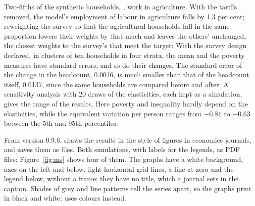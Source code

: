 Two-fifths of the synthetic households, , work in agriculture.
With the tariffs removed, the model's employment of labour in agriculture
falls by 1.3 per cent; reweighting the survey so that the agricultural
households fall in the same proportion lowers their weights by that much and
leaves the others' unchanged, the closest weights to the survey's that meet
the target:
With the survey design declared, in clusters of ten households in four
strata, the mean and the poverty measures have standard errors, and so do
their changes. The standard error of the change in the headcount, 0.0016, is
much smaller than that of the headcount itself, 0.0137, since the same
households are compared before and after:
A sensitivity analysis with 20 draws of the elasticities, each kept as a
simulation, gives the range of the results. Here poverty and inequality
hardly depend on the elasticities, while the equivalent variation per person
ranges from $-0.81$ to $-0.63$ between the 5th and 95th percentiles:


From version 0.9.6,  draws the results in the style of figures in
economics journals, and  saves them as files. Both simulations,
with labels for the legends, as PDF files:
Figure~\ref{fig:ms} shows four of them. The graphs have a white background,
axes on the left and below, light horizontal grid lines, a line at zero and
the legend below, without a frame; they have no title, which a journal sets in
the caption. Shades of grey and line patterns tell the series apart, so the
graphs print in black and white;  uses colours instead.

